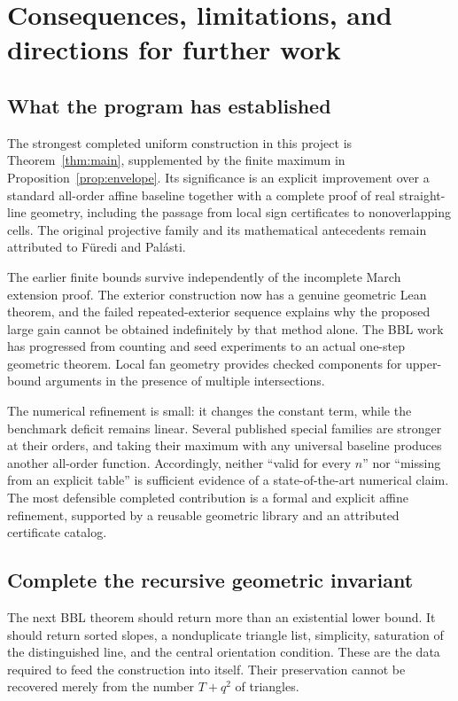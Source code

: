 \section{Consequences, limitations, and directions for further work}\label{sec:discussion}

\subsection{What the program has established}

The strongest completed uniform construction in this project is Theorem~\ref{thm:main}, supplemented by the finite maximum in Proposition~\ref{prop:envelope}. Its significance is an explicit improvement over a standard all-order affine baseline together with a complete proof of real straight-line geometry, including the passage from local sign certificates to nonoverlapping cells. The original projective family and its mathematical antecedents remain attributed to F\"uredi and Pal\'asti.

The earlier finite bounds survive independently of the incomplete March extension proof. The exterior construction now has a genuine geometric Lean theorem, and the failed repeated-exterior sequence explains why the proposed large gain cannot be obtained indefinitely by that method alone. The BBL work has progressed from counting and seed experiments to an actual one-step geometric theorem. Local fan geometry provides checked components for upper-bound arguments in the presence of multiple intersections.

The numerical refinement is small: it changes the constant term, while the benchmark deficit remains linear. Several published special families are stronger at their orders, and taking their maximum with any universal baseline produces another all-order function. Accordingly, neither ``valid for every $n$'' nor ``missing from an explicit table'' is sufficient evidence of a state-of-the-art numerical claim. The most defensible completed contribution is a formal and explicit affine refinement, supported by a reusable geometric library and an attributed certificate catalog.

\subsection{Complete the recursive geometric invariant}

The next BBL theorem should return more than an existential lower bound. It should return sorted slopes, a nonduplicate triangle list, simplicity, saturation of the distinguished line, and the central orientation condition. These are the data required to feed the construction into itself. Their preservation cannot be recovered merely from the number $T+q^2$ of triangles.

